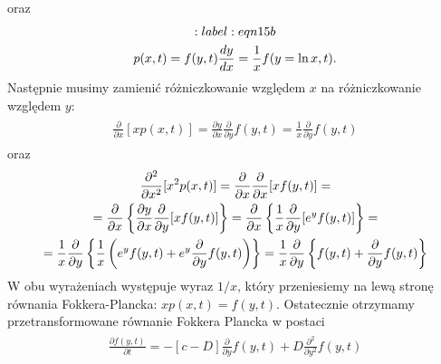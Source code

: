 \documentclass[a4paper,12pt,polish]{sphinxmanual}
\begin{document}
oraz
\begin{gather}
\begin{split}:label:eqn15b\end{split}\notag\\\begin{split}p(x, t) = f(y, t) \frac{dy}{dx} = \frac{1}{x} f(y=\ln x, t).\end{split}\notag
\end{gather}
Następnie musimy zamienić różniczkowanie względem $x$ na różniczkowanie względem $y$:
\label{ch3/chIII033:equation-eqn16}\begin{gather}
\begin{split}\frac{\partial}{\partial x} [x p(x, t)] = \frac{\partial y}{\partial x} \frac{\partial}{\partial y} f(y, t) = \frac{1}{x} \frac{\partial}{\partial y} f(y, t)\end{split}\label{ch3/chIII033-eqn16}
\end{gather}
oraz
\label{ch3/chIII033:equation-eqn17}\begin{gather}
\begin{split}\frac{\partial^2}{\partial x^2} [x^2 p(x, t)] = \frac{\partial }{\partial x} \frac{\partial}{\partial x} [x f(y, t)] =\end{split}\label{ch3/chIII033-eqn17}\\\begin{split}= \frac{\partial}{\partial x} \left\{ \frac{\partial y}{\partial x} \frac{\partial}{\partial y} [ x f(y, t)] \right\} = \frac{\partial}{\partial x} \left\{ \frac{1}{x} \frac{\partial}{\partial y} [e^y f(y, t)] \right\} =\end{split}\notag\\\begin{split}= \frac{1}{x} \frac{\partial}{\partial y} \left\{ \frac{1}{x} \left(e^y f(y, t) + e^y \frac{\partial}{\partial y} f(y, t)\right) \right\} = \frac{1}{x} \frac{\partial}{\partial y} \left\{ f(y, t) + \frac{\partial}{\partial y} f(y, t)\right\}\end{split}\notag
\end{gather}
W obu wyrażeniach występuje wyraz $1/x$, który przeniesiemy na lewą stronę równania Fokkera-Plancka: $x p(x, t) = f(y, t)$. Ostatecznie otrzymamy przetransformowane równanie Fokkera Plancka w postaci
\label{ch3/chIII033:equation-eqn18}\begin{gather}
\begin{split}\frac{\partial f(y, t)}{\partial t} = - [c -D] \frac{\partial}{\partial y} f(y, t) + D \frac{\partial^2}{\partial y^2} f(y, t)\end{split}\label{ch3/chIII033-eqn18}
\end{gather}
\end{document}

